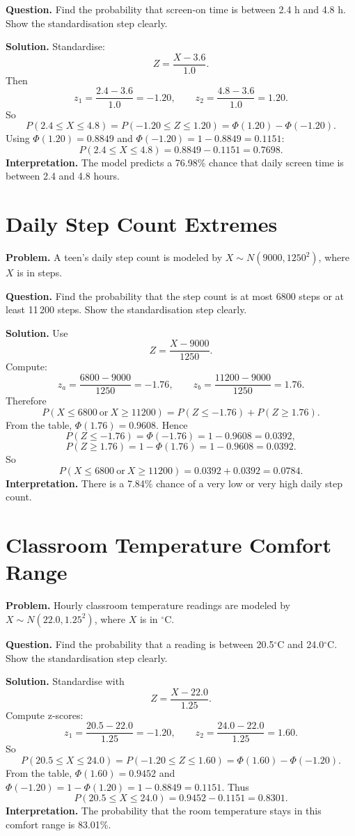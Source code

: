 \textbf{Question.}
Find the probability that screen-on time is between 2.4 h and 4.8 h.
Show the standardisation step clearly.

\textbf{Solution.}
Standardise:
\[
Z=\frac{X-3.6}{1.0}.
\]
Then
\[
z_1=\frac{2.4-3.6}{1.0}=-1.20,
\qquad
z_2=\frac{4.8-3.6}{1.0}=1.20.
\]
So
\[
P(2.4\le X\le 4.8)=P(-1.20\le Z\le 1.20)=\Phi(1.20)-\Phi(-1.20).
\]
Using \(\Phi(1.20)=0.8849\) and \(\Phi(-1.20)=1-0.8849=0.1151\):
\[
P(2.4\le X\le 4.8)=0.8849-0.1151=0.7698.
\]
\textbf{Interpretation.}
The model predicts a 76.98\% chance that daily screen time is between 2.4 and 4.8 hours.

\section{Daily Step Count Extremes}

\textbf{Problem.}
A teen's daily step count is modeled by
\(X\sim N(9000,1250^2)\), where \(X\) is in steps.

\textbf{Question.}
Find the probability that the step count is at most 6800 steps or at least 11\,200 steps.
Show the standardisation step clearly.

\textbf{Solution.}
Use
\[
Z=\frac{X-9000}{1250}.
\]
Compute:
\[
z_a=\frac{6800-9000}{1250}=-1.76,
\qquad
z_b=\frac{11200-9000}{1250}=1.76.
\]
Therefore
\[
P(X\le 6800\ \text{or}\ X\ge 11200)=P(Z\le -1.76)+P(Z\ge 1.76).
\]
From the table, \(\Phi(1.76)=0.9608\). Hence
\[
P(Z\le -1.76)=\Phi(-1.76)=1-0.9608=0.0392,
\]
\[
P(Z\ge 1.76)=1-\Phi(1.76)=1-0.9608=0.0392.
\]
So
\[
P(X\le 6800\ \text{or}\ X\ge 11200)=0.0392+0.0392=0.0784.
\]
\textbf{Interpretation.}
There is a 7.84\% chance of a very low or very high daily step count.

\section{Classroom Temperature Comfort Range}

\textbf{Problem.}
Hourly classroom temperature readings are modeled by
\(X\sim N(22.0,1.25^2)\), where \(X\) is in \(^\circ\)C.

\textbf{Question.}
Find the probability that a reading is between 20.5\(^\circ\)C and 24.0\(^\circ\)C.
Show the standardisation step clearly.

\textbf{Solution.}
Standardise with
\[
Z=\frac{X-22.0}{1.25}.
\]
Compute z-scores:
\[
z_1=\frac{20.5-22.0}{1.25}=-1.20,
\qquad
z_2=\frac{24.0-22.0}{1.25}=1.60.
\]
So
\[
P(20.5\le X\le 24.0)=P(-1.20\le Z\le 1.60)=\Phi(1.60)-\Phi(-1.20).
\]
From the table, \(\Phi(1.60)=0.9452\) and \(\Phi(-1.20)=1-\Phi(1.20)=1-0.8849=0.1151\).
Thus
\[
P(20.5\le X\le 24.0)=0.9452-0.1151=0.8301.
\]
\textbf{Interpretation.}
The probability that the room temperature stays in this comfort range is 83.01\%.


